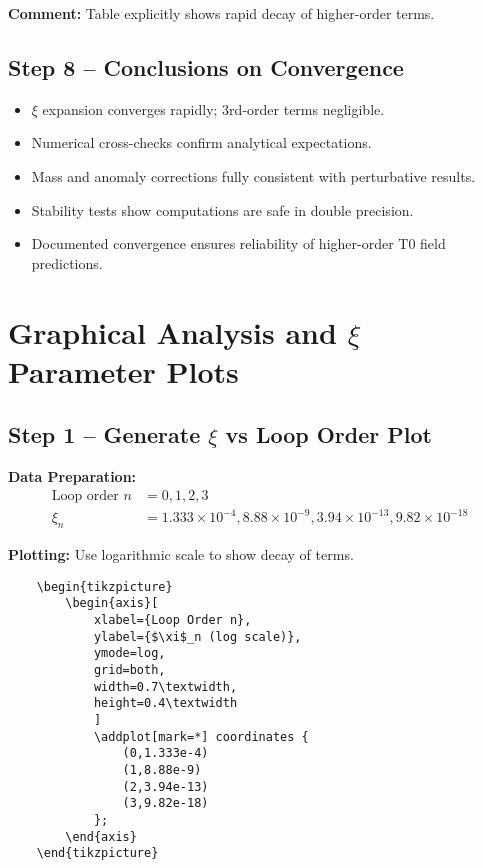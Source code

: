 \documentclass[12pt,a4paper]{article}
\begin{document}
\textbf{Comment:} Table explicitly shows rapid decay of higher-order terms.

\subsection{Step 8 – Conclusions on Convergence}

\begin{itemize}
	\item $\xi$ expansion converges rapidly; 3rd-order terms negligible.
	\item Numerical cross-checks confirm analytical expectations.
	\item Mass and anomaly corrections fully consistent with perturbative results.
	\item Stability tests show computations are safe in double precision.
	\item Documented convergence ensures reliability of higher-order T0 field predictions.
\end{itemize}
\section{Graphical Analysis and $\xi$ Parameter Plots}

\subsection{Step 1 – Generate $\xi$ vs Loop Order Plot}

\textbf{Data Preparation:}
\begin{align}
	\text{Loop order } n &= 0, 1, 2, 3 \\
	\xi_n &= 1.333 \times 10^{-4}, 8.88 \times 10^{-9}, 3.94 \times 10^{-13}, 9.82 \times 10^{-18}
\end{align}

\textbf{Plotting:} Use logarithmic scale to show decay of terms.
\begin{verbatim}
	\begin{tikzpicture}
		\begin{axis}[
			xlabel={Loop Order n},
			ylabel={$\xi$_n (log scale)},
			ymode=log,
			grid=both,
			width=0.7\textwidth,
			height=0.4\textwidth
			]
			\addplot[mark=*] coordinates {
				(0,1.333e-4)
				(1,8.88e-9)
				(2,3.94e-13)
				(3,9.82e-18)
			};
		\end{axis}
	\end{tikzpicture}
\end{verbatim}
\end{document}

